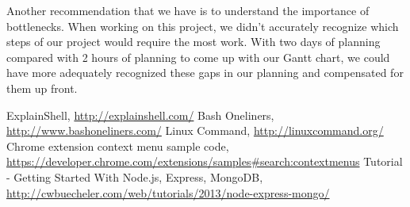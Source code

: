 \documentclass[11pt]{article}
\begin{document}
Another recommendation that we have is to understand the importance of
bottlenecks. When working on this project, we didn't accurately recognize which
steps of our project would require the most work. With two days of planning
compared with 2 hours of planning to come up with our Gantt chart, we could have
more adequately recognized these gaps in our planning and compensated for them
up front.

\newpage

\begin{thebibliography}{9}
      ExplainShell, \url{http://explainshell.com/}
    Bash Oneliners, \url{http://www.bashoneliners.com/}
    Linux Command, \url{http://linuxcommand.org/}
    Chrome extension context menu sample code,
    \url{https://developer.chrome.com/extensions/samples#search:contextmenus}
    Tutorial - Getting Started With Node.js, Express, MongoDB,
    \url{http://cwbuecheler.com/web/tutorials/2013/node-express-mongo/}
\end{thebibliography}
\end{document}
